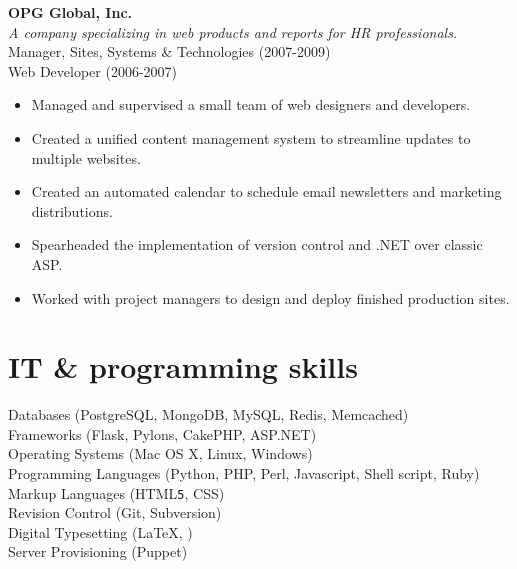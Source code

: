 \documentclass[10pt, a4paper]{article}
\newcommand{\years}[1]{\marginnote{\scriptsize #1}}
\begin{document}
\years{2006-2009}\textbf{OPG Global, Inc.}\\
\textit{A company specializing in web products and reports for HR professionals.}\\
Manager, Sites, Systems \& Technologies {\scriptsize (2007-2009)}\\
Web Developer {\scriptsize (2006-2007)}
\begin{itemize}
\item Managed and supervised a small team of web designers and developers.
\item Created a unified content management system to streamline updates to multiple websites.
\item Created an automated calendar to schedule email newsletters and marketing distributions.
\item Spearheaded the implementation of version control and .NET over classic ASP.
\item Worked with project managers to design and deploy finished production sites.
\end{itemize}

\section*{IT \& programming skills}
\noindent
Databases (PostgreSQL, MongoDB, MySQL, Redis, Memcached)\\
Frameworks (Flask, Pylons, CakePHP, ASP.NET)\\ %
Operating Systems (Mac OS X, Linux, Windows)\\
Programming Languages (Python, PHP, Perl, Javascript, Shell script, Ruby)\\ %
Markup Languages (HTML\texttt{5}, CSS)\\ %
Revision Control (Git, Subversion)\\
Digital Typesetting (\LaTeX, \XeTeX)\\
Server Provisioning (Puppet)\\
\end{document}

